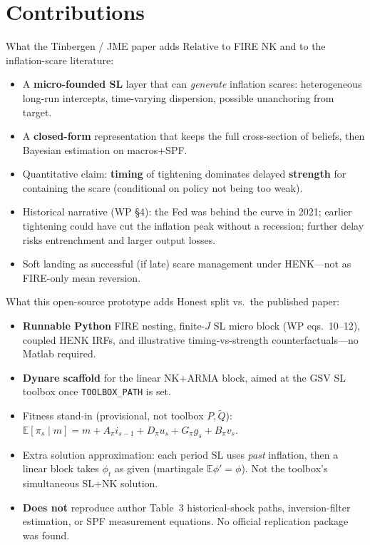 \documentclass[11pt,aspectratio=169]{beamer}
\begin{document}
\section{Contributions}
\begin{frame}{What the Tinbergen / JME paper adds}
  Relative to FIRE NK and to the inflation-scare literature:
  \begin{itemize}
    \item A \textbf{micro-founded SL} layer that can \emph{generate}
          inflation scares: heterogeneous long-run intercepts, time-varying
          dispersion, possible unanchoring from target.
    \item A \textbf{closed-form} representation that keeps the full
          cross-section of beliefs, then Bayesian estimation on macros+SPF.
    \item Quantitative claim: \textbf{timing} of tightening dominates
          delayed \textbf{strength} for containing the scare (conditional
          on policy not being too weak).
    \item Historical narrative (WP \S4): the Fed was behind the curve in
          2021; earlier tightening could have cut the inflation peak
          without a recession; further delay risks entrenchment and
          larger output losses.
    \item Soft landing as successful (if late) scare management under
          HENK---not as FIRE-only mean reversion.
  \end{itemize}
\end{frame}

\begin{frame}{What this open-source prototype adds}
  Honest split vs.\ the published paper:
  \begin{itemize}
    \item \textbf{Runnable Python} FIRE nesting, finite-$J$ SL micro block
          (WP eqs.\ 10--12), coupled HENK IRFs, and illustrative
          timing-vs-strength counterfactuals---no Matlab required.
    \item \textbf{Dynare scaffold} for the linear NK+ARMA block, aimed at
          the GSV SL toolbox once \texttt{TOOLBOX\_PATH} is set.
    \item Fitness stand-in (provisional, not toolbox $P,\widetilde Q$):
          $\mathbb{E}[\pi_s\mid m]
           = m + A_\pi i_{s-1} + D_\pi u_s + G_\pi g_s + B_\pi v_s$.
    \item Extra solution approximation: each period SL uses \emph{past}
          inflation, then a linear block takes $\phi_t$ as given
          (martingale $\mathbb{E}\phi'=\phi$). Not the toolbox's
          simultaneous SL+NK solution.
    \item \textbf{Does not} reproduce author Table~3 historical-shock
          paths, inversion-filter estimation, or SPF measurement equations.
          No official replication package was found.
  \end{itemize}
\end{frame}
\end{document}
